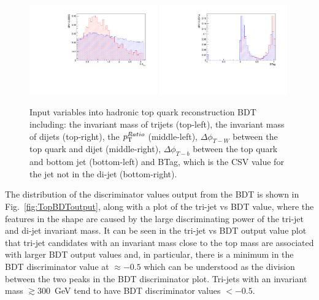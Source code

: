 \begin{figure}[ht!]
    \includegraphics[width=0.49\textwidth]{images/Run1/AnThBh.pdf}
     \includegraphics[width=0.49\textwidth]{images/Run1/BTag.pdf}          
    \caption{Input variables into hadronic top quark reconstruction BDT including: the invariant mass of trijets (top-left), the invariant mass of dijets (top-right), the $p_{\mathrm{T}}^{Ratio}$ (middle-left), $\Delta\phi_{T-W}$ between the top quark and dijet (middle-right), $\Delta\phi_{T-b}$ between the top quark and bottom jet (bottom-left) and BTag, which is the CSV value for the jet not in the di-jet (bottom-right).}
    \label{fig:TopBDTinput}
\end{figure}

The distribution of the discriminator values output from the BDT is shown in Fig.~\ref{fig:TopBDToutput}, along with a plot of the tri-jet vs BDT value, where the features in the shape are caused by the large discriminating power of the tri-jet and di-jet invariant mass. It can be seen in the tri-jet vs BDT output value plot that tri-jet candidates with an invariant mass close to the top mass are associated with larger BDT output values and, in particular, there is a minimum in the BDT discriminator value at $\approx -0.5$ which can be understood as the division between the two peaks in the BDT discriminator plot. Tri-jets with an invariant mass $\gtrsim 300$~GeV tend to have BDT discriminator values $< -0.5$.

